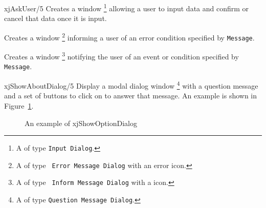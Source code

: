 \begin{description}
%
	{xjAskUser/5}
%
Creates a window \footnote{A  of type {\tt Input
Dialog}.} allowing a user to input data and confirm or cancel that
data once it is input.

Creates a window \footnote{A  of type {\tt
Error Message Dialog} with an error icon.} informing a user of an error
condition specified by {\tt Message}.

Creates a window \footnote{A  of type {\tt
Inform Message Dialog} with a  icon.} notifying the user of an event
or condition specified by {\tt Message}.

%




 {xjShowAboutDialog/5}
%
Display a modal dialog window \footnote{A  of type
{\tt Question Message Dialog}.} with a question message and a set of
buttons to click on to answer that message.  An example is shown in
Figure~\ref{fig:xjShowOptionDialog}.

\begin{figure}[htbp] \label{fig:xjShowOptionDialog}
\caption{An example of xjShowOptionDialog}
\end{figure}


\end{description}
